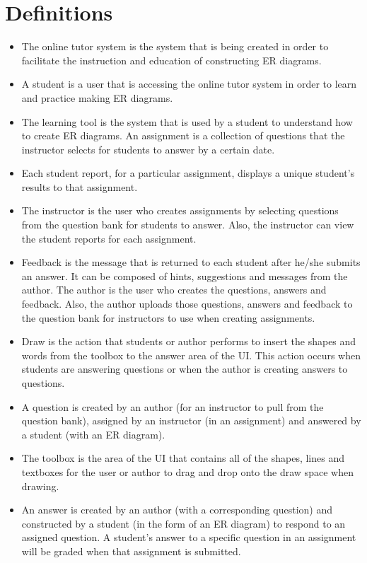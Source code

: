 \chapter{Definitions}
\begin{itemize}
\item The online tutor system is the system that is being created in order to facilitate the instruction and education of constructing ER diagrams.
\item A student is a user that is accessing the online tutor system in order to learn and practice making ER diagrams.
\item The learning tool is the system that is used by a student to understand how to create ER diagrams.
An assignment is a collection of questions that the instructor selects for students to answer by a certain date.
\item Each student report, for a particular assignment, displays a unique student’s results to that assignment.
\item The instructor is the user who creates assignments by selecting questions from the question bank for students to answer. Also, the instructor can view the student reports for each assignment.
\item Feedback is the message that is returned to each student after he/she submits an answer. It can be composed of hints, suggestions and messages from the author.
The author is the user who creates the questions, answers and feedback. Also, the author uploads those questions, answers and feedback to the question bank for instructors to use when creating assignments.
\item Draw is the action that students or author performs to insert the shapes and words from the toolbox to the answer area of the UI. This action occurs when students are answering questions or when the author is creating answers to questions.
\item A question is created by an author (for an instructor to pull from the question bank), assigned by an instructor (in an assignment) and answered by a student (with an ER diagram).
\item  The toolbox is the area of the UI that contains all of the shapes, lines and textboxes for the user or author to drag and drop onto the draw space when drawing.
\item An answer is created by an author (with a corresponding question) and constructed by a student (in the form of an ER diagram) to respond to an assigned question. A student’s answer to a specific question in an assignment will be graded when that assignment is submitted.

\end{itemize}
